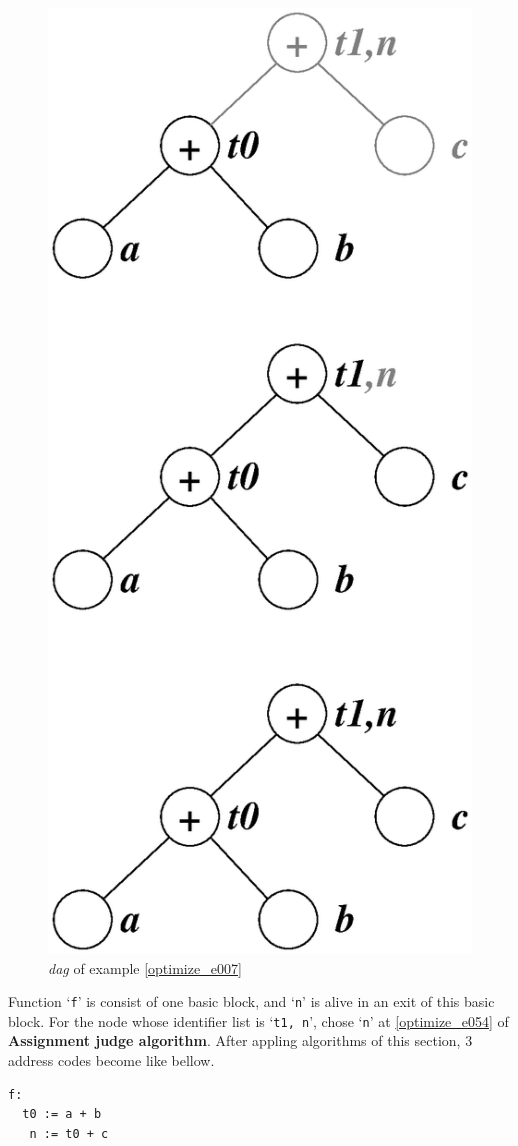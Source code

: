 \begin{Example}
\begin{figure}[htbp]
\begin{center}
\begin{latexonly}
\includegraphics[width=0.468\linewidth,height=1.0\linewidth]{opt001.eps}
\end{latexonly}
\caption{{\em dag} of example \ref{optimize_e007}}
\label{optimize_e008}
\end{center}
\end{figure}
Function `{\tt{f}}' is consist of one basic block, and 
`{\tt{n}}' is alive in an exit of this basic block.
For the node whose identifier list is `{\tt{t1, n}}',
chose `{\tt{n}}' at \ref{optimize_e054} of {\bf Assignment judge algorithm}.
After appling algorithms of this section,
3 address codes become like bellow.
\begin{verbatim}
f:
  t0 := a + b
   n := t0 + c
\end{verbatim}
\end{Example}

